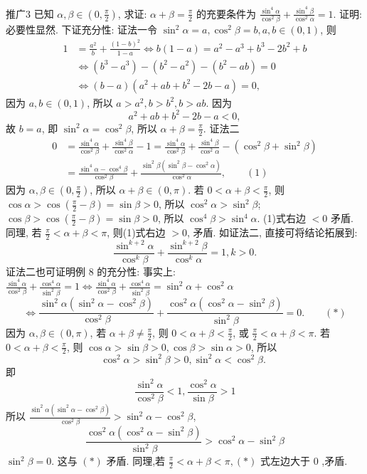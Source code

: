 推广3 已知 $\alpha, \beta \in\left(0, \frac{\pi}{2}\right)$, 求证: $\alpha+\beta=\frac{\pi}{2}$ 的充要条件为 $\frac{\sin ^4 \alpha}{\cos ^2 \beta}+ \frac{\sin ^4 \beta}{\cos ^2 \alpha}=1$.
证明:必要性显然.
下证充分性:
证法一令 $\sin ^2 \alpha=a, \cos ^2 \beta=b, a, b \in(0,1)$, 则
$$
\begin{aligned}
1 & =\frac{a^2}{b}+\frac{(1-b)^2}{1-a} \Leftrightarrow b(1-a)=a^2-a^3+b^3-2 b^2+b \\
& \Leftrightarrow\left(b^3-a^3\right)-\left(b^2-a^2\right)-\left(b^2-a b\right)=0 \\
& \Leftrightarrow(b-a)\left(a^2+a b+b^2-2 b-a\right)=0,
\end{aligned}
$$
因为 $a, b \in(0,1)$, 所以 $a>a^2, b>b^2, b>a b$.
因为
$$
a^2+a b+b^2-2 b-a<0,
$$
故 $b=a$, 即 $\sin ^2 \alpha=\cos ^2 \beta$, 所以 $\alpha+\beta=\frac{\pi}{2}$.
证法二 
$$
\begin{aligned}
0 & =\frac{\sin ^4 \alpha}{\cos ^2 \beta}+\frac{\sin ^4 \beta}{\cos ^2 \alpha}-1=\frac{\sin ^4 \alpha}{\cos ^2 \beta}+\frac{\sin ^4 \beta}{\cos ^2 \alpha}-\left(\cos ^2 \beta+\sin ^2 \beta\right) \\
& =\frac{\sin ^4 \alpha-\cos ^4 \beta}{\cos ^2 \beta}+\frac{\sin ^2 \beta\left(\sin ^2 \beta-\cos ^2 \alpha\right)}{\cos ^2 \alpha}, \quad \quad (1)
\end{aligned}
$$
因为 $\alpha, \beta \in\left(0, \frac{\pi}{2}\right)$, 所以 $\alpha+\beta \in(0, \pi)$.
若 $0<\alpha+\beta<\frac{\pi}{2}$, 则
$\cos \alpha>\cos \left(\frac{\pi}{2}-\beta\right)=\sin \beta>0$, 所以 $\cos ^2 \alpha>\sin ^2 \beta$;
$\cos \beta>\cos \left(\frac{\pi}{2}-\beta\right)=\sin \beta>0$, 所以 $\cos ^4 \beta>\sin ^4 \alpha$.
(1)式右边 $<0$ 矛盾.
同理, 若 $\frac{\pi}{2}<\alpha+\beta<\pi$, 则(1)式右边 $>0$, 矛盾.
如证法二, 直接可将结论拓展到:
$$
\frac{\sin ^{k+2} \alpha}{\cos ^k \beta}+\frac{\sin ^{k+2} \beta}{\cos ^k \alpha}=1, k>0 .
$$
证法二也可证明例 8 的充分性:
事实上: $\frac{\sin ^4 \alpha}{\cos ^2 \beta}+\frac{\cos ^4 \alpha}{\sin ^2 \beta}=1 \Leftrightarrow \frac{\sin ^4 \alpha}{\cos ^2 \beta}+\frac{\cos ^4 \alpha}{\sin ^2 \beta}=\sin ^2 \alpha+\cos ^2 \alpha$
$$
\Leftrightarrow \frac{\sin ^2 \alpha\left(\sin ^2 \alpha-\cos ^2 \beta\right)}{\cos ^2 \beta}+\frac{\cos ^2 \alpha\left(\cos ^2 \alpha-\sin ^2 \beta\right)}{\sin ^2 \beta}=0 . \quad\quad (*)
$$
因为 $\alpha, \beta \in(0, \pi)$, 若 $\alpha+\beta \neq \frac{\pi}{2}$, 则 $0<\alpha+\beta<\frac{\pi}{2}$, 或 $\frac{\pi}{2}<\alpha+\beta<\pi$.
若 $0<\alpha+\beta<\frac{\pi}{2}$, 则 $\cos \alpha>\sin \beta>0, \cos \beta>\sin \alpha>0$, 所以
$$
\cos ^2 \alpha>\sin ^2 \beta>0, \sin ^2 \alpha<\cos ^2 \beta \text {. }
$$
即
$$
\frac{\sin ^2 \alpha}{\cos ^2 \beta}<1, \frac{\cos ^2 \alpha}{\sin \beta}>1
$$
所以 $\frac{\sin ^2 \alpha\left(\sin ^2 \alpha-\cos ^2 \beta\right)}{\cos ^2 \beta}>\sin ^2 \alpha-\cos ^2 \beta$,
$$
\frac{\cos ^2 \alpha\left(\cos ^2 \alpha-\sin ^2 \beta\right)}{\sin ^2 \beta}>\cos ^2 \alpha-\sin ^2 \beta
$$
$\sin ^2 \beta=0$.
这与 $(*)$ 矛盾.
同理,若 $\frac{\pi}{2}<\alpha+\beta<\pi,(*)$ 式左边大于 0 ,矛盾.



